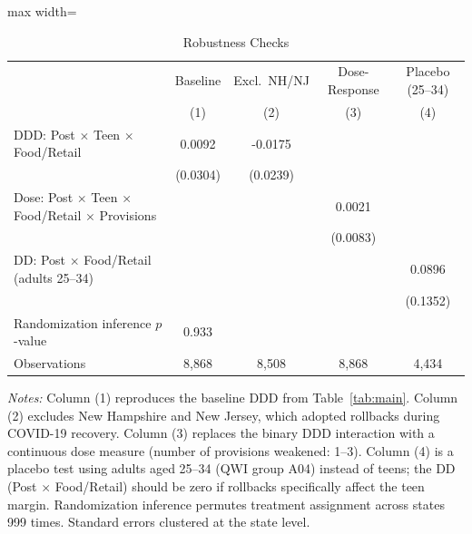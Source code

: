 \begin{table}[htbp]
\centering
\caption{Robustness Checks}
\label{tab:robust}
\begin{adjustbox}{max width=\textwidth}
\begin{tabular}{lcccc}
\toprule
 & Baseline & Excl.\ NH/NJ & Dose-Response & Placebo (25--34) \\
 & (1) & (2) & (3) & (4) \\
\midrule
DDD: Post $\times$ Teen $\times$ Food/Retail & 0.0092 & -0.0175 & & \\
 & (0.0304) & (0.0239) & & \\
[0.5em]
Dose: Post $\times$ Teen $\times$ Food/Retail $\times$ Provisions & & & 0.0021 & \\
 & & & (0.0083) & \\
[0.5em]
DD: Post $\times$ Food/Retail (adults 25--34) & & & & 0.0896 \\
 & & & & (0.1352) \\
\midrule
Randomization inference $p$-value & 0.933 & & & \\
Observations & 8,868 & 8,508 & 8,868 & 4,434 \\
\bottomrule
\end{tabular}
\end{adjustbox}

\vspace{0.5em}
\begin{minipage}{\textwidth}
\footnotesize
\textit{Notes:} Column (1) reproduces the baseline DDD from Table~\ref{tab:main}. Column (2) excludes New Hampshire and New Jersey, which adopted rollbacks during COVID-19 recovery. Column (3) replaces the binary DDD interaction with a continuous dose measure (number of provisions weakened: 1--3). Column (4) is a placebo test using adults aged 25--34 (QWI group A04) instead of teens; the DD (Post $\times$ Food/Retail) should be zero if rollbacks specifically affect the teen margin. Randomization inference permutes treatment assignment across states 999 times. Standard errors clustered at the state level.
\end{minipage}
\end{table}
